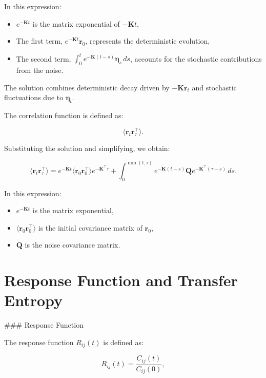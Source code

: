 \documentclass[English, Lau, oneside]{sapthesis}
\begin{document}
\begin{itemize}
In this expression:
\begin{itemize}
    \item \(e^{-\mathbf{K} t}\) is the matrix exponential of \(-\mathbf{K} t\),
    \item The first term, \(e^{-\mathbf{K} t} \mathbf{r}_0\), represents the deterministic evolution,
    \item The second term, \(\int_0^t e^{-\mathbf{K} (t-s)} \boldsymbol{\eta}_s \, ds\), accounts for the stochastic contributions from the noise.
\end{itemize}

The solution combines deterministic decay driven by \(-\mathbf{K} \mathbf{r}_t\) and stochastic fluctuations due to \(\boldsymbol{\eta}_t\).

The correlation function is defined as:

\begin{equation}
\langle \mathbf{r}_t \mathbf{r}_\tau^\top \rangle.
\end{equation}

Substituting the solution and simplifying, we obtain:

\begin{equation}
\langle \mathbf{r}_t \mathbf{r}_\tau^\top \rangle = e^{-\mathbf{K} t} \langle \mathbf{r}_0 \mathbf{r}_0^\top \rangle e^{-\mathbf{K}^\top \tau}
+ \int_0^{\min(t, \tau)} e^{-\mathbf{K} (t-s)} \mathbf{Q} e^{-\mathbf{K}^\top (\tau-s)} \, ds.
\end{equation}

In this expression:
\begin{itemize}
    \item \(e^{-\mathbf{K} t}\) is the matrix exponential,
    \item \(\langle \mathbf{r}_0 \mathbf{r}_0^\top \rangle\) is the initial covariance matrix of \(\mathbf{r}_0\),
    \item \(\mathbf{Q}\) is the noise covariance matrix.
\end{itemize}



\section*{Response Function and Transfer Entropy}

### Response Function

The response function \(R_{ij}(t)\) is defined as:

\begin{equation}
R_{ij}(t) = \frac{C_{ij}(t)}{C_{ij}(0)},
\end{equation}


\end{itemize}
\end{document}

